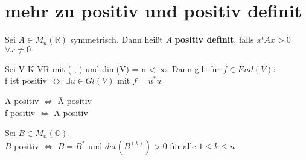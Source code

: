 \section{mehr zu positiv und positiv definit}
\begin{definition}
Sei $A \in M_n(\mathbb{R})$ symmetrisch. Dann heißt $A$ \textbf{positiv definit}, falls $x^tAx > 0$ $\forall x \neq 0$
\end{definition}
\begin{theorem}
\leavevmode
\begin{compactitem}
\item Sei V K-VR mit ( , ) und dim(V) = n < $\infty$. Dann gilt für $f \in End(V)$:\\
f ist positiv $\Leftrightarrow$ $\exists u \in Gl(V)$ mit $f = u^*u$
\item A positiv $\Leftrightarrow$ \={A} positiv\\
f positiv $\Leftrightarrow$ A positiv
\item Sei $B \in M_n(\mathbb{C})$.\\
$B$ positiv $\Leftrightarrow$ $B = B^*$ und $det(B^{(k)}) > 0$ für alle $1 \le k \le n$
\end{compactitem}
\end{theorem}


